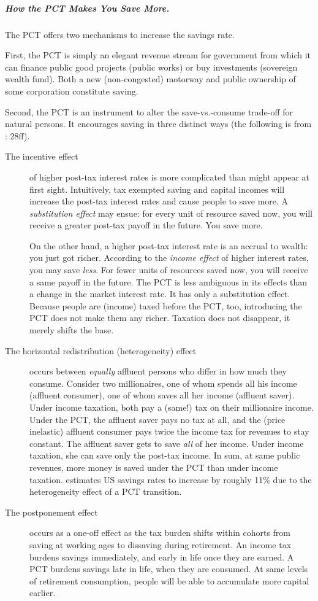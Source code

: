 \subparagraph{How the PCT Makes You Save More.} The PCT offers two mechanisms to increase the savings rate.

First, the PCT is simply an elegant revenue stream for government from which it can finance public good projects (public works) or buy investments (sovereign wealth fund). Both a new (non-congested) motorway and public ownership of some corporation constitute saving.

Second, the PCT is an instrument to alter the save-vs.-consume trade-off for natural persons. It encourages saving in three distinct ways (the following is from \citealt{Seidman1997}: 28ff).
\begin{description}
	\item[The incentive effect] of higher post-tax interest rates is more complicated than might appear at first sight. Intuitively, tax exempted saving and capital incomes will increase the post-tax interest rates and cause people to save more. A \emph{substitution effect} may ensue: for every unit of resource saved now, you will receive a greater post-tax payoff in the future. You save more.

On the other hand, a higher post-tax interest rate is an accrual to wealth: you just got richer. According to the \emph{income effect} of higher interest rates, you may save \emph{less}. For fewer units of resources saved now, you will receive a same payoff in the future.
The PCT is less ambiguous in its effects than a change in the market interest rate. It has only a substitution effect. Because people are (income) taxed before the PCT, too, introducing the PCT does not make them any richer. Taxation does not disappear, it merely shifts the base.%
	\item[The horizontal redistribution (heterogeneity) effect] occurs between \emph{equally} affluent persons who differ in how much they consume. Consider two millionaires, one of whom spends all his income (affluent consumer), one of whom saves all her income (affluent saver). Under income taxation, both pay a (same!) tax on their millionaire income. Under the PCT, the affluent saver pays no tax at all, and the (price inelastic) affluent consumer pays twice the income tax for revenues to stay constant. The affluent saver gets to save \emph{all} of her income. Under income taxation, she can save only the post-tax income. In sum, at same public revenues, more money is saved under the PCT than under income taxation. \citeauthor{Seidman1997} estimates US savings rates to increase by roughly 11\% due to the heterogeneity effect of a PCT transition.
	\item[The postponement effect] occurs as a one-off effect as the tax burden shifts within cohorts from saving at working ages to dissaving during retirement. An income tax burdens savings immediately, and early in life once they are earned. A PCT burdens savings late in life, when they are consumed. At same levels of retirement consumption, people will be able to accumulate more capital earlier.


\end{description}
